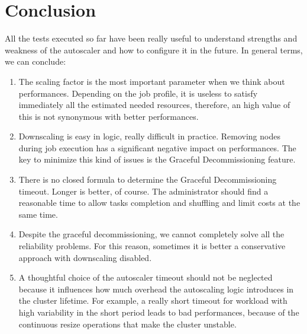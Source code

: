 \documentclass[12pt,twoside,cucitura]{toptesi}
\begin{document}
\chapter{Conclusion}
All the tests executed so far have been really useful to understand strengths and weakness of the autoscaler and how to configure it in the future. In general terms, we can conclude:
\begin{enumerate}
	\item The scaling factor is the most important parameter when we think about performances. Depending on the job profile, it is useless to satisfy immediately all the estimated needed resources, therefore, an high value of this is not synonymous with better performances.
	\item Downscaling is easy in logic, really difficult in practice. Removing nodes during job execution has a significant negative impact on performances. The key to minimize this kind of issues is the Graceful Decommissioning feature. 
	\item There is no closed formula to determine the Graceful Decommissioning timeout. Longer is better, of course. The administrator should find a reasonable time to allow tasks completion and shuffling and limit costs at the same time.
	\item Despite the graceful decommissioning, we cannot completely solve all the reliability problems. For this reason, sometimes it is better a conservative approach with downscaling disabled.
	\item A thoughtful choice of the autoscaler timeout should not be neglected because it influences how much overhead the autoscaling logic introduces in the cluster lifetime. For example, a really short timeout for workload with high variability in the short period leads to bad performances, because of the continuous resize operations that make the cluster unstable.
\end{enumerate}
\end{document}
